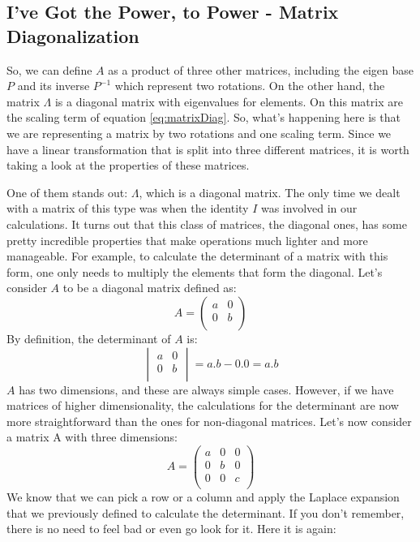 \documentclass[600paper, 11pt,twoside,openany]{kdp}
\begin{document}
\subsection{I’ve Got the Power, to Power - Matrix Diagonalization}
\indent 
So, we can define $A$ as a product of three other matrices, including the eigen base $P$ and its inverse $P^{−1}$ which represent two rotations. On the other hand, the matrix  $\Lambda$ is a diagonal matrix with eigenvalues for elements. On this matrix are the scaling term of equation \ref{eq:matrixDiag}. So, what’s happening here is that we are representing a matrix by two rotations and one scaling term. Since we have a linear transformation that is split into three different matrices, it is worth taking a look at the properties of these matrices. 
\par 
\vspace{-3pt}
\indent One of them stands out: $\Lambda$, which is a diagonal matrix. The only time we dealt with a matrix of this type was when the identity $I$ was involved in our calculations. It turns out that this class of matrices, the diagonal ones, has some pretty incredible properties that make operations much lighter and more manageable. For example, to calculate the determinant of a matrix with this form, one only needs to multiply the elements that form the diagonal. Let’s consider $A$ to be a diagonal matrix defined as:
\[A = \begin{pmatrix}
a & 0 \\
0 & b \\
\end{pmatrix}
\]
By definition, the determinant of $A$ is:
\[
\begin{vmatrix}
a & 0 \\
0 & b \\
\end{vmatrix} = a.b- 0.0 = a.b
\]
\indent $A$ has two dimensions, and these are always simple cases. However, if we have matrices of higher dimensionality, the calculations for the determinant are now more straightforward than the ones for non-diagonal matrices. Let’s now consider a matrix A with three dimensions:
\[
A = \begin{pmatrix}
a & 0 & 0\\
0 & b & 0\\
0 & 0 & c\\
\end{pmatrix}
\]
\indent We know that we can pick a row or a column and apply the Laplace expansion that we previously defined to calculate the determinant. If you don’t remember, there is no need to feel bad or even go look for it. Here it is again:
\end{document}
